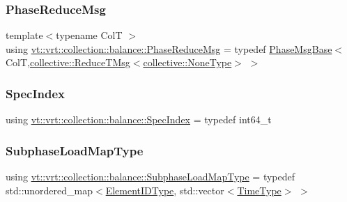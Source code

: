\mbox{\label{namespacevt_1_1vrt_1_1collection_1_1balance_a04cf83e524629461fafc8d349af8ac8a}} 
\subsubsection{\texorpdfstring{Phase\+Reduce\+Msg}{PhaseReduceMsg}}
{\footnotesize\ttfamily template$<$typename ColT $>$ \\
using \hyperlink{namespacevt_1_1vrt_1_1collection_1_1balance_a04cf83e524629461fafc8d349af8ac8a}{vt\+::vrt\+::collection\+::balance\+::\+Phase\+Reduce\+Msg} = typedef \hyperlink{structvt_1_1vrt_1_1collection_1_1balance_1_1_phase_msg_base}{Phase\+Msg\+Base}$<$ ColT,\hyperlink{namespacevt_1_1collective_a28b82d5d48c9bc6e4fd738fcbf9e0f62}{collective\+::\+Reduce\+T\+Msg}$<$\hyperlink{namespacevt_1_1collective_af988b64711231f96d33ebfaf891e52a4}{collective\+::\+None\+Type}$>$ $>$}

\mbox{\label{namespacevt_1_1vrt_1_1collection_1_1balance_a72a5e0d9936ddf57f8e6c64e0e9fd123}} 
\subsubsection{\texorpdfstring{Spec\+Index}{SpecIndex}}
{\footnotesize\ttfamily using \hyperlink{namespacevt_1_1vrt_1_1collection_1_1balance_a72a5e0d9936ddf57f8e6c64e0e9fd123}{vt\+::vrt\+::collection\+::balance\+::\+Spec\+Index} = typedef int64\+\_\+t}

\mbox{\label{namespacevt_1_1vrt_1_1collection_1_1balance_a3d91523158c1025b7b665240072f3b7e}} 
\subsubsection{\texorpdfstring{Subphase\+Load\+Map\+Type}{SubphaseLoadMapType}}
{\footnotesize\ttfamily using \hyperlink{namespacevt_1_1vrt_1_1collection_1_1balance_a3d91523158c1025b7b665240072f3b7e}{vt\+::vrt\+::collection\+::balance\+::\+Subphase\+Load\+Map\+Type} = typedef std\+::unordered\+\_\+map$<$\hyperlink{namespacevt_1_1vrt_1_1collection_1_1balance_a14c8d2c972f2913aa3f1636e5be0a120}{Element\+I\+D\+Type}, std\+::vector$<$\hyperlink{namespacevt_a876a9d0cd5a952859c72de8a46881442}{Time\+Type}$>$ $>$}



